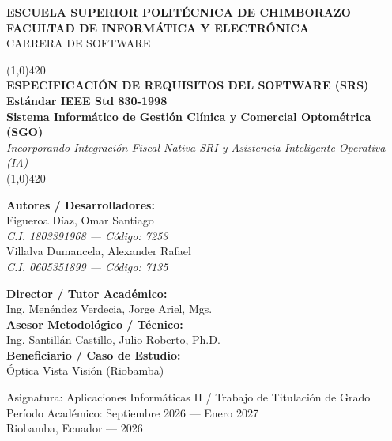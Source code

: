 \documentclass[12pt,a4paper]{report}
\begin{document}
\begin{titlepage}
    \centering
    \vspace*{0.5cm}
    {\Huge\textbf{\textsf{ESCUELA SUPERIOR POLITÉCNICA DE CHIMBORAZO}}}\\[0.4cm]
    {\LARGE\textbf{\textsf{FACULTAD DE INFORMÁTICA Y ELECTRÓNICA}}}\\[0.3cm]
    {\Large\textsf{CARRERA DE SOFTWARE}}\\[1.2cm]

    \begin{center}
        \line(1,0){420}\\[0.4cm]
        {\huge\bfseries\color{primaryBlue} ESPECIFICACIÓN DE REQUISITOS DEL SOFTWARE (SRS)}\\[0.3cm]
        {\Large\textbf{Estándar IEEE Std 830-1998}}\\[0.2cm]
        {\large\bfseries Sistema Informático de Gestión Clínica y Comercial Optométrica (SGO)}\\[0.2cm]
        {\normalsize\textit{Incorporando Integración Fiscal Nativa SRI y Asistencia Inteligente Operativa (IA)}}\\[0.2cm]
        \line(1,0){420}
    \end{center}

    \vspace{1.5cm}

    \begin{minipage}{0.48\textwidth}
        \textbf{Autores / Desarrolladores:} \\
        Figueroa Díaz, Omar Santiago \\
        \small{\textit{C.I. 1803391968 --- Código: 7253}} \\[0.2cm]
        Villalva Dumancela, Alexander Rafael \\
        \small{\textit{C.I. 0605351899 --- Código: 7135}}
    \end{minipage}
    \hfill
    \begin{minipage}{0.48\textwidth}
        \raggedleft
        \textbf{Director / Tutor Académico:} \\
        Ing. Menéndez Verdecia, Jorge Ariel, Mgs. \\[0.2cm]
        \textbf{Asesor Metodológico / Técnico:} \\
        Ing. Santillán Castillo, Julio Roberto, Ph.D. \\[0.2cm]
        \textbf{Beneficiario / Caso de Estudio:} \\
        Óptica Vista Visión (Riobamba)
    \end{minipage}

    \vfill

    {\large\textsf{Asignatura: Aplicaciones Informáticas II / Trabajo de Titulación de Grado}}\\[0.2cm]
    {\normalsize Período Académico: Septiembre 2026 --- Enero 2027}\\[0.2cm]
    {\normalsize Riobamba, Ecuador --- 2026}
\end{titlepage}
\end{document}
